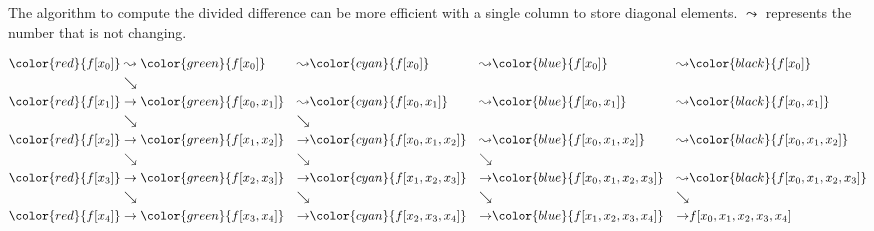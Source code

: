 \begin{remark}
    The algorithm to compute the divided difference can be more efficient with a single column to store diagonal elements. $\leadsto$ represents the number that is not changing.
    \begin{tcolorbox}
        \begin{equation}
        \begin{aligned}
            \color{red}{f[x_0]} &    \leadsto  \color{green}{f[x_0]}          & \leadsto& \color{cyan}{f[x_0]} &\leadsto& \color{blue}{f[x_0]} &\leadsto& \color{black}{f[x_0]}\\ 
                   &\searrow       &\\ 
                   \color{red}{f[x_1]} &\to \color{green}{f[x_0, x_1]}&  \leadsto& \color{cyan}{f[x_0, x_1]}  &\leadsto& \color{blue}{f[x_0, x_1]} &\leadsto& \color{black}{f[x_0, x_1]}\\
                   &\searrow        &\searrow&\\ 
                   \color{red}{f[x_2]} & \to \color{green}{f[x_1, x_2]}&\to& \color{cyan}{f[x_0, x_1, x_2]} &\leadsto& \color{blue}{f[x_0, x_1, x_2]}&\leadsto& \color{black}{f[x_0, x_1, x_2]}\\
                   &\searrow        &\searrow& &\searrow&\\ 
                   \color{red}{f[x_3]} &\to \color{green}{f[x_2, x_3] }&\to& \color{cyan}{f[x_1, x_2, x_3]} &\to & \color{blue}{f[x_0, x_1, x_2, x_3]}&\leadsto& \color{black}{f[x_0, x_1, x_2, x_3]}\\
                   &\searrow        &\searrow & &\searrow&  &\searrow &\\ 
                   \color{red}{f[x_4]} & \to \color{green}{f[x_3, x_4]}&\to& \color{cyan}{f[x_2, x_3, x_4]} &\to & \color{blue}{f[x_1, x_2, x_3, x_4]} &\to&  f[x_0, x_1, x_2, x_3, x_4] 
        \end{aligned}
    \end{equation}
    \end{tcolorbox}
\end{remark}

